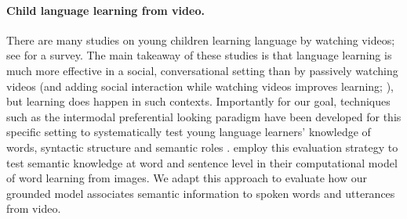\paragraph{Child language learning from video.}
 There are many studies on young children learning language by watching videos; see \cite{vanderplank2010deja} for a survey. The main takeaway of these studies is that language learning is much more effective in a social, conversational setting than by passively watching videos \cite{kuhl2003foreign,anderson2005television,robb2009just} (and adding social interaction while watching videos improves learning; \citet{lytle2018two}), but learning does happen in such contexts. Importantly for our goal, techniques such as the intermodal preferential looking paradigm have been developed for this specific setting to systematically test young language learners' knowledge of words, syntactic structure and semantic roles \cite{hirsh1996intermodal,bergelson20126,noble2011comprehension}. \citet{nikolaus-fourtassi-2021-evaluating} employ this evaluation strategy to test semantic knowledge at word and sentence level in their computational model of word learning from images. We adapt this approach to evaluate how our grounded model associates semantic information to spoken words and utterances from video. 
 
 






